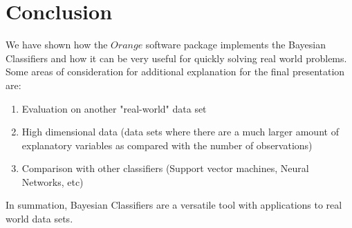 

\graphicspath{{C:/Documents and Settings/amcelhinney/My Documents/GitHub/MCS507ProjectTwo/tex/include/}}

\section{Conclusion} %
We have shown how the $Orange$ software package implements the Bayesian Classifiers and how it can be very useful for quickly solving real world problems. Some areas of consideration for additional explanation for the final presentation are:
\begin{enumerate}
\item Evaluation on another "real-world" data set
\item High dimensional data (data sets where there are a much larger amount of explanatory variables as compared with the number of observations)
\item Comparison with other classifiers (Support vector machines, Neural Networks, etc)
\end{enumerate}

In summation, Bayesian Classifiers are a versatile tool with applications to real world data sets. 